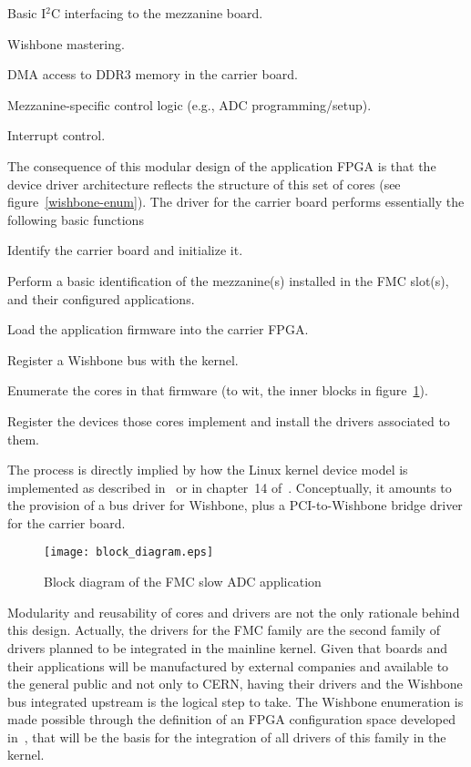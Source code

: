 \documentclass{JAC2003}
\begin{document}
\begin{Itemize}
\item Basic I${}^2$C interfacing to the mezzanine board.
\item Wishbone mastering.
\item DMA access to DDR3 memory in the carrier board.
\item Mezzanine-specific control logic (e.g., ADC programming/setup).
\item Interrupt control.
\end{Itemize}
The consequence of this modular design of the application FPGA is that
the device driver architecture reflects the structure of this set of cores
(see figure~\ref{wishbone-enum}). The driver for the carrier board performs
essentially the following basic functions
\begin{Itemize}
\item Identify the carrier board and initialize it.
\item Perform a basic identification of the mezzanine(s) installed in
    the FMC slot(s), and their configured applications.
\item Load the application firmware into the carrier FPGA.
\item Register a Wishbone bus with the kernel.
\item Enumerate the cores in that firmware (to wit, the
    inner blocks in figure~\ref{slow-adc}).
\item Register the devices those cores implement and install the drivers
    associated to them.
\end{Itemize}
The process is directly implied by how the Linux kernel device model
is implemented as described in~\cite{device-model} or in chapter~14
of~\cite{rubini}. Conceptually, it amounts to the provision of a bus driver
for Wishbone, plus a PCI-to-Wishbone bridge driver for the carrier board.

\begin{figure}[t]
   \centering
   \texttt{[image: block\_diagram.eps]}
   \caption{Block diagram of the FMC slow ADC application}
   \label{slow-adc}
\end{figure}

Modularity and reusability of cores and drivers are not the only rationale
behind this design. Actually, the drivers for the FMC family are the second
family of drivers planned to be integrated in the mainline kernel. Given
that boards and their applications will be manufactured by external
companies and available to the general public and not only to CERN,
having their drivers and the Wishbone
bus integrated upstream is the logical step to take. The Wishbone enumeration is made
possible through the definition of an FPGA configuration space developed
in~\cite{fpga-config-space}, that will be the basis for the integration of
all drivers of this family in the kernel.
\end{document}

